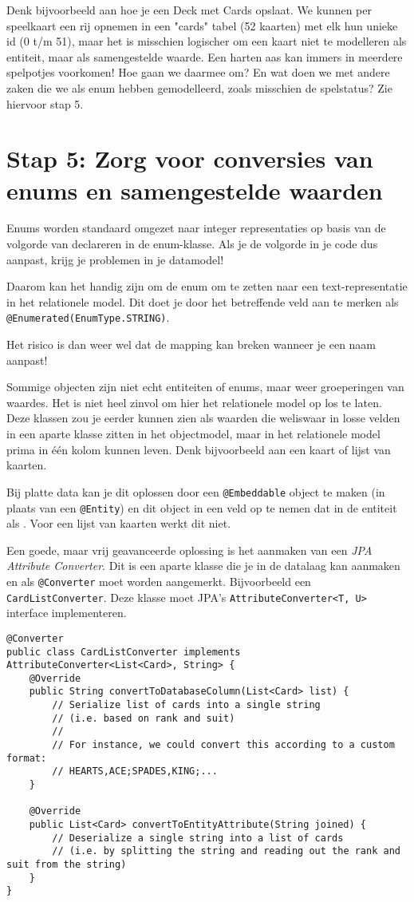 Denk bijvoorbeeld aan hoe je een Deck met Cards opslaat.
We kunnen per speelkaart 
een rij opnemen in een "cards" tabel (52 kaarten) 
met elk hun unieke id (0 t/m 51), maar het is misschien logischer 
om een kaart niet te modelleren als entiteit, maar als samengestelde waarde.
Een harten aas kan immers in meerdere spelpotjes voorkomen!
Hoe gaan we daarmee om? En wat doen we met andere zaken die 
we als enum hebben gemodelleerd, zoals misschien de spelstatus?
Zie hiervoor stap 5.

\section{Stap 5: Zorg voor conversies van enums en samengestelde waarden}
Enums worden standaard omgezet naar integer representaties
op basis van de volgorde van declareren in de enum-klasse.
Als je de volgorde in je code dus aanpast, krijg je problemen 
in je datamodel!

Daarom kan het handig zijn om de enum om te zetten naar een 
text-representatie in het relationele model. Dit doet je 
door het betreffende veld aan te merken als \texttt{@Enumerated(EnumType.STRING)}. 

Het risico is dan weer wel dat de 
mapping kan breken wanneer je een naam aanpast!

Sommige objecten zijn niet echt entiteiten of enums, maar weer 
groeperingen van waardes. Het is niet heel zinvol om hier 
het relationele model op los te laten. Deze klassen zou je 
eerder kunnen zien als waarden die weliswaar in losse velden 
in een aparte klasse zitten in het objectmodel, maar in het 
relationele model prima in één kolom kunnen leven.
Denk bijvoorbeeld aan een kaart of lijst van kaarten.

Bij platte data kan je dit oplossen door een 
\texttt{@Embeddable} object te maken (in plaats van een 
\texttt{@Entity}) en dit object in een  
veld op te nemen dat in de entiteit als .
Voor een lijst van kaarten werkt dit niet.

Een goede, maar vrij geavanceerde oplossing is het aanmaken 
van een \textit{JPA Attribute Converter}. Dit is een aparte 
klasse die je in de datalaag kan aanmaken en als \texttt{@Converter}
moet worden aangemerkt. Bijvoorbeeld een \texttt{CardListConverter}.
Deze klasse moet JPA's \texttt{AttributeConverter<T, U>}
interface implementeren.

\begin{verbatim}
@Converter
public class CardListConverter implements AttributeConverter<List<Card>, String> {
    @Override
    public String convertToDatabaseColumn(List<Card> list) {
        // Serialize list of cards into a single string 
        // (i.e. based on rank and suit)
        //
        // For instance, we could convert this according to a custom format: 
        // HEARTS,ACE;SPADES,KING;...
    }

    @Override
    public List<Card> convertToEntityAttribute(String joined) {
        // Deserialize a single string into a list of cards
        // (i.e. by splitting the string and reading out the rank and suit from the string)
    }
}
\end{verbatim}

